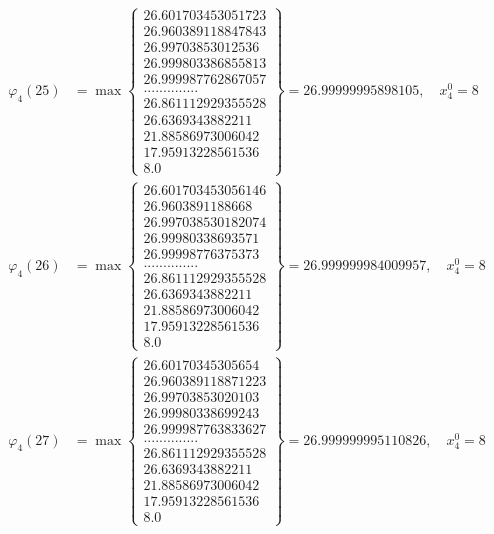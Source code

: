 \documentclass{article}
\begin{document}
\begin{align*}
  
  
  
\varphi_{4}(25) &= \max \left\{ \begin{array}{c}
26.601703453051723 \\
 26.960389118847843 \\
 26.99703853012536 \\
 26.999803386855813 \\
 26.999987762867057 \\
 .............. \\
 26.861112929355528 \\
 26.6369343882211 \\
 21.88586973006042 \\
 17.95913228561536 \\
 8.0
\end{array} \right\} = 26.99999995898105, \quad x_{4}^0 = 8\\
  
  
  
  
\varphi_{4}(26) &= \max \left\{ \begin{array}{c}
26.601703453056146 \\
 26.9603891188668 \\
 26.997038530182074 \\
 26.99980338693571 \\
 26.99998776375373 \\
 .............. \\
 26.861112929355528 \\
 26.6369343882211 \\
 21.88586973006042 \\
 17.95913228561536 \\
 8.0
\end{array} \right\} = 26.999999984009957, \quad x_{4}^0 = 8\\
  
  
  
  
\varphi_{4}(27) &= \max \left\{ \begin{array}{c}
26.60170345305654 \\
 26.960389118871223 \\
 26.99703853020103 \\
 26.99980338699243 \\
 26.999987763833627 \\
 .............. \\
 26.861112929355528 \\
 26.6369343882211 \\
 21.88586973006042 \\
 17.95913228561536 \\
 8.0
\end{array} \right\} = 26.999999995110826, \quad x_{4}^0 = 8\\
  

\end{align*}
\end{document}
